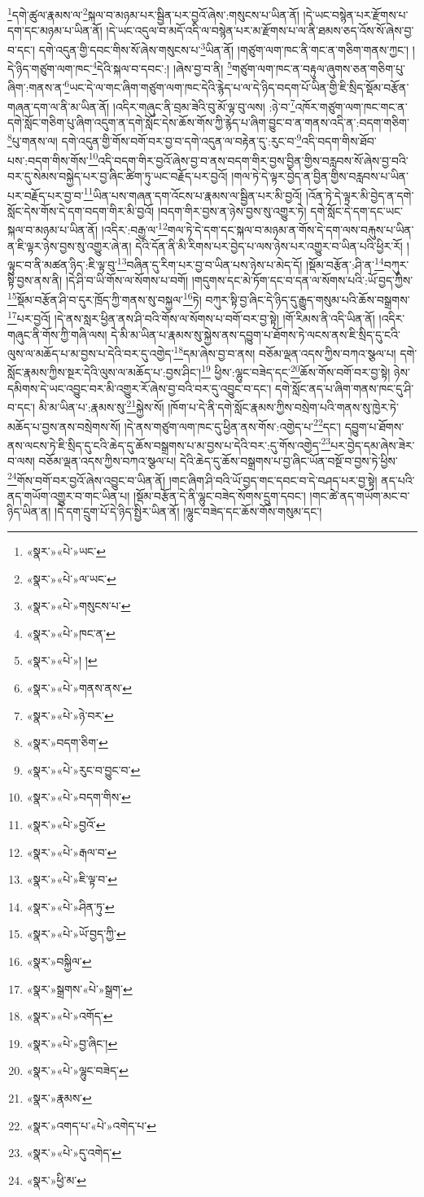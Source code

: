 \footnote{«སྣར་»«པེ་»ཡང་}དགེ་ཚུལ་རྣམས་ལ་\footnote{«སྣར་»«པེ་»ལ་ཡང་}སྐལ་བ་མཉམ་པར་སྦྱིན་པར་བྱའོ་ཞེས་:གསུངས་པ་ཡིན་ནོ། །དེ་ཡང་བསྙེན་པར་རྫོགས་པ་དག་དང་མཉམ་པ་ཡིན་ནོ། །དེ་ཡང་འདུལ་བ་མདོ་འདི་ལ་བསྙེན་པར་མ་རྫོགས་པ་ལ་ནི་ཐམས་ཅད་འོས་སོ་ཞེས་བྱ་བ་དང་། དགེ་འདུན་གྱི་དབང་གིས་སོ་ཞེས་གསུངས་པ་\footnote{«སྣར་»«པེ་»གསུངས་པ་}ཡིན་ནོ། །གཙུག་ལག་ཁང་ནི་གང་ན་གཅིག་གནས་ཀྱང་། །དེ་ཉིད་གཙུག་ལག་ཁང་\footnote{«སྣར་»«པེ་»ཁང་ན་}དེའི་སྐལ་བ་དབང་:། །ཞེས་བྱ་བ་ནི། \footnote{«སྣར་»«པེ་»། ། }གཙུག་ལག་ཁང་ན་བརྟུལ་ཞུགས་ཅན་གཅིག་པུ་ཞིག་:གནས་ན་\footnote{«སྣར་»«པེ་»གནས་ནས་}ཡང་དེ་ལ་གང་ཞིག་གཙུག་ལག་ཁང་དེའི་རྙེད་པ་ལ་དེ་ཉིད་བདག་པོ་ཡིན་གྱི་ཇི་སྲིད་སྡོམ་བརྩོན་གཞན་དག་ལ་ནི་མ་ཡིན་ནོ། །འདིར་གཞུང་ནི་བྲམ་ཟེའི་བུ་མོ་ལྟ་བུ་ལས། :ཉེ་བ་\footnote{«སྣར་»«པེ་»ཉེ་བར་}འཁོར་གཙུག་ལག་ཁང་གང་ན་དགེ་སློང་གཅིག་པུ་ཞིག་འདུག་ན་དགེ་སློང་དེས་ཆོས་གོས་ཀྱི་རྙེད་པ་ཞིག་བྱུང་བ་ན་གནས་འདི་ན་:བདག་གཅིག་\footnote{«སྣར་»བདག་ཅིག་}པུ་གནས་ལ། དགེ་འདུན་གྱི་གོས་བགོ་བར་བྱ་བ་དགེ་འདུན་ལ་བརྟེན་དུ་:རུང་བ་\footnote{«སྣར་»«པེ་»རུང་བ་བྱུང་བ་}འདི་བདག་གིས་ཐོབ་པས་:བདག་གིས་གོས་\footnote{«སྣར་»«པེ་»བདག་གིས་}འདི་བདག་གིར་བྱའོ་ཞེས་བྱ་བ་ནས་བདག་གིར་བྱས་བྱིན་གྱིས་བརླབས་སོ་ཞེས་བྱ་བའི་བར་དུ་སེམས་བསྐྱེད་པར་བྱ་ཞིང་ཚིག་ཏུ་ཡང་བརྗོད་པར་བྱའོ། །གལ་ཏེ་དེ་ལྟར་བྱེད་ན་བྱིན་གྱིས་བརླབས་པ་ཡིན་པར་བརྗོད་པར་བྱ་བ་\footnote{«སྣར་»«པེ་»བྱའོ་}ཡིན་པས་གཞན་དག་འོངས་པ་རྣམས་ལ་སྦྱིན་པར་མི་བྱའོ། །འོན་ཏེ་དེ་ལྟར་མི་བྱེད་ན་དགེ་སློང་དེས་གོས་དེ་དག་བདག་གིར་མི་བྱའོ། །བདག་གིར་བྱས་ན་ཉེས་བྱས་སུ་འགྱུར་ཏེ། དགེ་སློང་དེ་དག་དང་ཡང་སྐལ་བ་མཉམ་པ་ཡིན་ནོ། །འདིར་:བརྒྱ་ལ་\footnote{«སྣར་»«པེ་»རྒལ་བ་}གལ་ཏེ་དེ་དག་དང་སྐལ་བ་མཉམ་ན་གོས་དེ་དག་ལས་བརྐུས་པ་ཡིན་ན་ཇི་ལྟར་ཉེས་བྱས་སུ་འགྱུར་ཞེ་ན། དེའི་དོན་ནི་མི་རིགས་པར་བྱེད་པ་ལས་ཉེས་པར་འགྱུར་བ་ཡིན་པའི་ཕྱིར་རོ། །ལྟུང་བ་ནི་མཚན་ཉིད་:ཇི་ལྟ་བུ་\footnote{«སྣར་»«པེ་»ཇི་ལྟ་བ་}བཞིན་དུ་རིག་པར་བྱ་བ་ཡིན་པས་ཉེས་པ་མེད་དོ། །སྡོམ་བརྩོན་:ཤི་ན་\footnote{«སྣར་»«པེ་»ཤིན་ཏུ་}བཀུར་སྟི་བྱས་ནས་ནི། །དེ་ཤི་བ་ཡི་གོས་ལ་སོགས་པ་བགོ། །གདུགས་དང་མེ་ཏོག་དང་བ་དན་ལ་སོགས་པའི་:ཡོ་བྱད་ཀྱིས་\footnote{«སྣར་»«པེ་»ཡོ་བྱད་ཀྱི་}སྡོམ་བརྩོན་ཤི་བ་དུར་ཁྲོད་ཀྱི་གནས་སུ་བསྐྱལ་\footnote{«སྣར་»བསྐྱིལ་}ཏེ། བཀུར་སྟི་བྱ་ཞིང་དེ་ཉིད་དུ་རྒྱུད་གསུམ་པའི་ཆོས་བསྒྲགས་\footnote{«སྣར་»སྒྲགས་«པེ་»སྒྲག་}པར་བྱའོ། །དེ་ནས་སླར་ཕྱིན་ནས་ཤི་བའི་གོས་ལ་སོགས་པ་བགོ་བར་བྱ་སྟེ། །གོ་རིམས་ནི་འདི་ཡིན་ནོ། །འདིར་གཞུང་ནི་གོས་ཀྱི་གཞི་ལས། དེ་མི་མ་ཡིན་པ་རྣམས་སུ་སྐྱེས་ནས་དབྱུག་པ་ཐོགས་ཏེ་ལངས་ནས་ཇི་སྲིད་དུ་ངའི་ལུས་ལ་མཆོད་པ་མ་བྱས་པ་དེའི་བར་དུ་འགྱེད་\footnote{«སྣར་»«པེ་»འགོད་}དམ་ཞེས་བྱ་བ་ནས། བཅོམ་ལྡན་འདས་ཀྱིས་བཀའ་སྩལ་པ། དགེ་སློང་རྣམས་ཀྱིས་སྔར་དེའི་ལུས་ལ་མཆོད་པ་:བྱས་ཤིང་།\footnote{«སྣར་»«པེ་»བྱ་ཞིང་།} ཕྱིས་:ལྷུང་བཟེད་དང་\footnote{«སྣར་»«པེ་»ལྷུང་བཟེད་}ཆོས་གོས་བགོ་བར་བྱ་སྟེ། ཉེས་དམིགས་དེ་ཡང་འབྱུང་བར་མི་འགྱུར་རོ་ཞེས་བྱ་བའི་བར་དུ་འབྱུང་བ་དང་། དགེ་སློང་ནད་པ་ཞིག་གནས་ཁང་དུ་ཤི་བ་དང་། མི་མ་ཡིན་པ་:རྣམས་སུ་\footnote{«སྣར་»རྣམས་}སྐྱེས་སོ། །ཁོག་པ་དེ་ནི་དགེ་སློང་རྣམས་ཀྱིས་བསྲེག་པའི་གནས་སུ་ཁྱེར་ཏེ་མཆོད་པ་བྱས་ནས་བསྲེགས་སོ། །དེ་ནས་གཙུག་ལག་ཁང་དུ་ཕྱིན་ནས་གོས་:འགྱེད་པ་\footnote{«སྣར་»འགད་པ་«པེ་»འགེད་པ་}དང་། དབྱུག་པ་ཐོགས་ནས་ལངས་ཏེ་ཇི་སྲིད་དུ་ངའི་ཆེད་དུ་ཆོས་བསྒྲགས་པ་མ་བྱས་པ་དེའི་བར་:དུ་གོས་འགྱེད་\footnote{«སྣར་»«པེ་»དུ་འགེད་}པར་བྱེད་དམ་ཞེས་ཟེར་བ་ལས། བཅོམ་ལྡན་འདས་ཀྱིས་བཀའ་སྩལ་པ། དེའི་ཆེད་དུ་ཆོས་བསྒྲགས་པ་བྱ་ཞིང་ཡོན་བསྔོ་བ་བྱས་ཏེ་ཕྱིས་\footnote{«སྣར་»ཕྱི་མ་}གོས་བགོ་བར་བྱའོ་ཞེས་འབྱུང་བ་ཡིན་ནོ། །གང་ཞིག་ཤི་བའི་ཡོ་བྱད་གང་དབང་བ་དེ་བཤད་པར་བྱ་སྟེ། ནད་པའི་ནད་གཡོག་འགྱུར་བ་གང་ཡིན་པ། །སྡོམ་བརྩོན་དེ་ནི་ལྷུང་བཟེད་སོགས་དྲུག་དབང་། །གང་ཚེ་ནད་གཡོག་མང་བ་ཉིད་ཡིན་ན། །དེ་དག་དྲུག་པོ་དེ་ཉིད་སྤྱིར་ཡིན་ནོ། །ལྷུང་བཟེད་དང་ཆོས་གོས་གསུམ་དང་། 